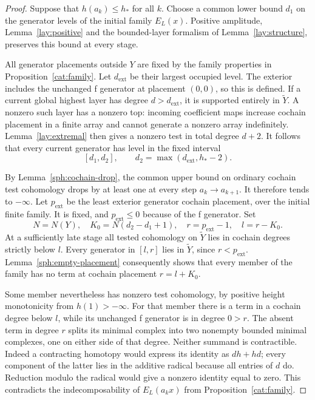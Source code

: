\begin{proof}
Suppose that \(h(a_k)\leq h_*\) for all \(k\).
Choose a common lower bound \(d_1\) on the generator
levels of the initial family \(E_L(x)\).
Positive amplitude, Lemma~\ref{lay:positive} and the
bounded-layer formalism of Lemma~\ref{lay:structure},
preserves this bound at every stage.

All generator placements outside \(Y\) are fixed by
the family properties in Proposition~\ref{cat:family}.
Let \(d_{\mathrm{ext}}\) be their largest occupied
level.  The exterior includes the unchanged f
generator at placement \((0,0)\), so this is defined.
If a current global highest layer has degree
\(d>d_{\mathrm{ext}}\), it is supported entirely in
\(\widetilde Y\).  A nonzero such layer has a nonzero
top: incoming coefficient maps increase cochain
placement in a finite array and cannot generate a
nonzero array indefinitely.  Lemma~\ref{lay:extremal}
then gives a nonzero test in total degree \(d+2\).
It follows that every current generator has level
in the fixed interval
\[
 [d_1,d_2],\qquad
 d_2=\max(d_{\mathrm{ext}},h_*-2).
\]

By Lemma~\ref{sph:cochain-drop}, the common upper bound
on ordinary cochain test cohomology drops by at least
one at every step \(a_k\to a_{k+1}\).
It therefore tends to \(-\infty\).
Let \(p_{\mathrm{ext}}\) be the least exterior
generator cochain placement, over the initial finite
family.  It is fixed, and \(p_{\mathrm{ext}}\leq0\)
because of the f generator.
Set
\[
 N=N(Y),\quad
 K_0=N(d_2-d_1+1),\quad
 r=p_{\mathrm{ext}}-1,\quad l=r-K_0.
\]
At a sufficiently late stage all tested cohomology
on \(\widetilde Y\) lies in cochain degrees strictly
below \(l\).  Every generator in \([l,r]\) lies in
\(\widetilde Y\), since \(r<p_{\mathrm{ext}}\).
Lemma~\ref{sph:empty-placement} consequently shows
that every member of the family has no term at
cochain placement \(r=l+K_0\).

Some member nevertheless has nonzero test cohomology,
by positive height monotonicity from \(h(1)>-\infty\).
For that member there is a term in a cochain degree
below \(l\), while its unchanged f generator is in
degree \(0>r\).
The absent term in degree \(r\) splits its minimal
complex into two nonempty bounded minimal complexes,
one on either side of that degree.
Neither summand is contractible.  Indeed a contracting
homotopy would express its identity as \(dh+hd\);
every component of the latter lies in the additive
radical because all entries of \(d\) do.  Reduction
modulo the radical would give a nonzero identity
equal to zero.
This contradicts the indecomposability of
\(E_L(a_kx)\) from Proposition~\ref{cat:family}.
\end{proof}

